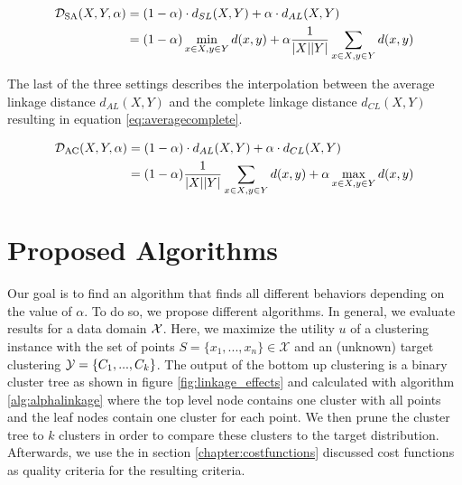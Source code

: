 \begin{equation}
    \begin{aligned}
        \mathcal{D}_\text{SA}(X,Y,\alpha) &= (1 - \alpha) \cdot d_{SL}(X,Y) + \alpha \cdot d_{AL}(X,Y)\\
        &= (1 - \alpha) \min\limits_{x \in X, y \in Y} d(x,y) + \alpha \frac{1}{|X| |Y|}\sum\limits_{x \in X, y \in Y} d(x,y)
    \end{aligned}
    \label{eq:singleaverage}
\end{equation}

The last of the three settings describes the interpolation between the average linkage distance $d_{AL}(X,Y)$ and the complete linkage distance $d_{CL}(X,Y)$ resulting in equation \ref{eq:averagecomplete}.

\begin{equation}
    \begin{aligned}
        \mathcal{D}_\text{AC}(X,Y,\alpha) &= (1 - \alpha) \cdot d_{AL}(X,Y) + \alpha \cdot d_{CL}(X,Y)\\
        &= (1 - \alpha) \frac{1}{|X| |Y|}\sum\limits_{x \in X, y \in Y} d(x,y) + \alpha \max\limits_{x \in X, y \in Y} d(x,y)
    \end{aligned}
    \label{eq:averagecomplete}
\end{equation}


\section{Proposed Algorithms}

Our goal is to find an algorithm that finds all different behaviors depending on the value of $\alpha$. To do so, we propose different algorithms. In general, we evaluate results for a data domain $\mathcal{X}$. Here, we maximize the utility $u$ of a clustering instance with the set of points $S = \{x_1, ..., x_n\} \in \mathcal{X}$ and an (unknown) target clustering $\mathcal{Y} = \{C_1, ..., C_k\}$. The output of the bottom up clustering is a binary cluster tree as shown in figure \ref{fig:linkage_effects} and calculated with algorithm \ref{alg:alphalinkage} where the top level node contains one cluster with all points and the leaf nodes contain one cluster for each point. We then prune the cluster tree to $k$ clusters in order to compare these clusters to the target distribution. Afterwards, we use the in section \ref{chapter:costfunctions} discussed cost functions as quality criteria for the resulting criteria.

